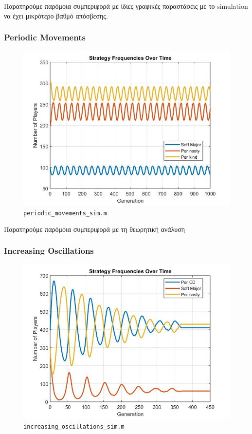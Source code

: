 Παρατηρούμε παρόμοια συμπεριφορά με ίδιες γραφικές παραστάσεις με το simulation να έχει μικρότερο βαθμό απόσβεσης.


\subsubsection{Periodic Movements}
\begin{figure}[th!]
\centering
\includegraphics[width=0.7\linewidth]{fit_plots_simulations/periodic_movements_sim}
\caption{\texttt{periodic\_movements\_sim.m}}
\label{fig:periodicmovementssim}
\end{figure}

Παρατηρούμε παρόμοια συμπεριφορά με τη θεωρητική ανάλυση
\subsubsection{Increasing Oscillations}
\begin{figure}[th!]
\centering
\includegraphics[width=0.7\linewidth]{fit_plots_simulations/increasing_oscillations_sim}
\caption{\texttt{increasing\_oscillations\_sim.m}}
\label{fig:increasingoscillationssim}
\end{figure}

